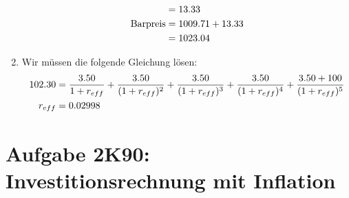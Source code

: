 \documentclass{article}
\begin{document}
\begin{enumerate}[label=(\alph*)]
\begin{align}
			&= 13.33 \notag \\
			\text{Barpreis} &= 1009.71 + 13.33 \notag \\
			&= 1023.04 \notag
		\end{align}
		\item Wir müssen die folgende Gleichung lösen:
		\begin{align}
			102.30 &= \frac{3.50}{1+r_{eff}} + \frac{3.50}{(1+r_{eff})^2} + \frac{3.50}{(1+r_{eff})^3} + \frac{3.50}{(1+r_{eff})^4} + \frac{3.50 + 100}{(1+r_{eff})^5} \notag \\
			r_{eff} &= 0.02998 \notag
		\end{align}
	\end{enumerate}
	
	
	\section*{Aufgabe 2K90: Investitionsrechnung mit Inflation}
\end{document}
